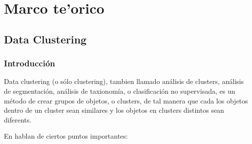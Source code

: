\chapter{Marco te'orico} \label{chap:ssimilar}

\vspace{5 mm}

\section{Data Clustering} \label{sect:dclust}

\subsection{Introducci\'on} \label{sect:dclusti}

Data clustering (o s\'olo clustering), tambien llamado an\'alisis de clusters, an\'alisis de segmentaci\'on,
an\'alisis de taxionom\'ia, o clasificaci\'on no supervisada, es un m\'etodo de crear grupos de objetos,
o clusters, de tal manera que cada los objetos dentro de un cluster sean similares y los objetos 
en clusters distintos sean diferents. \cite{GaChJi2007}

En \cite{SwAjAm2009} hablan de ciertos puntos importantes:

